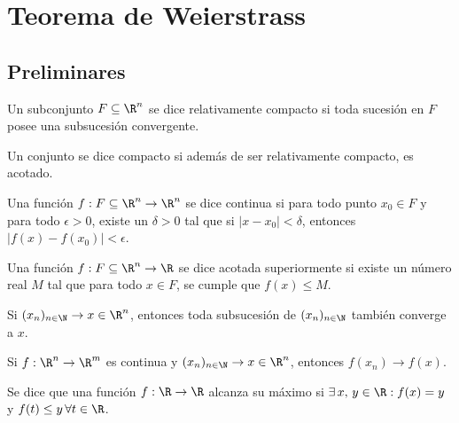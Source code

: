 \section{Teorema de Weierstrass}

\subsection{Preliminares}

\begin{definition}
    Un subconjunto \(F \subseteq \R^n\) se dice relativamente compacto si toda sucesión en \(F\) posee una subsucesión convergente.
\end{definition}

\begin{definition}[Compacto]
    Un conjunto se dice compacto si además de ser relativamente compacto, es acotado.
\end{definition}

\begin{definition}
    Una función \(f: F \subseteq \R^n \to \R^n\) se dice continua si para todo punto \(x_0 \in F\) y para todo \(\epsilon > 0\), existe un \(\delta > 0\) tal que si \(|x - x_0| < \delta\), entonces \(|f(x) - f(x_0)| < \epsilon\).
\end{definition}

\begin{definition}
    Una función \(f: F \subseteq \R^n \to \R\) se dice acotada superiormente si existe un número real \(M\) tal que para todo \(x \in F\), se cumple que \(f(x) \leq M\).
\end{definition}

\begin{prop}
    Si \((x_n)_{n \in \N} \to x \in \R^n\), entonces toda subsucesión de \((x_n)_{n \in \N}\) también converge a \(x\).
\end{prop}

\begin{prop}
    Si \(f : \R^n \to \R^m\) es continua y \((x_n)_{n \in \N} \to x \in \R^n\), entonces \(f(x_n) \to f(x)\).
\end{prop}

\begin{definition}
    Se dice que una función \(f : \R \to \R\) alcanza su máximo si \(\exists \, x \text{, } y \in \R : f(x) = y\) y \(f(t) \leq y \, \forall t \in \R\).
\end{definition}

